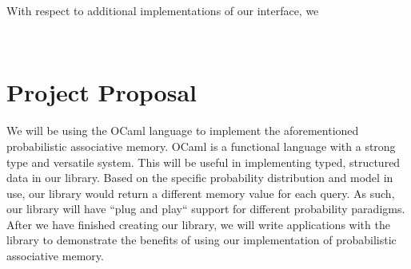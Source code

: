 \documentclass{sig-alternate}
\begin{document}
With respect to additional implementations of our interface, we 

~\cite{ivanov14} %
~\cite{latex_wikibook} %
~\cite{ctan_pdf}%




\section{Project Proposal}
\label{sec:project_proposal}
We will be using the OCaml language to implement the aforementioned probabilistic 
associative memory. OCaml is a functional language with a strong type and versatile
system. This will be useful in implementing typed, structured data in our library. 
Based on the specific probability distribution and model in use, our library would return 
a different memory value for each query. As such, our library will have ``plug and play`` support for 
different probability paradigms. After we have finished creating our library, we will 
write applications with the library to demonstrate the benefits of using our implementation
of probabilistic associative memory.
\end{document}
